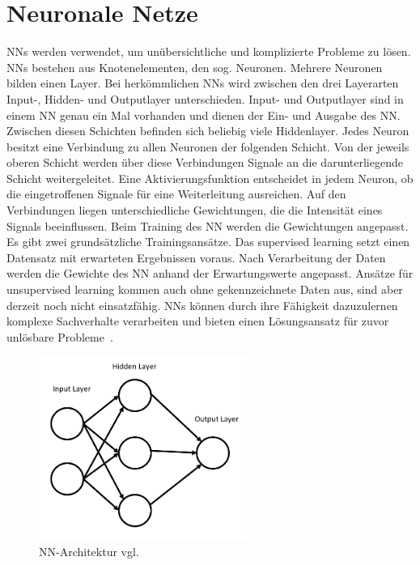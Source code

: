 \section*{Neuronale Netze}
NNs werden verwendet, um unübersichtliche und komplizierte Probleme zu lösen. NNs bestehen aus Knotenelementen, den sog. Neuronen. Mehrere Neuronen bilden einen Layer. Bei herkömmlichen NNs wird zwischen den drei Layerarten Input-, Hidden- und Outputlayer unterschieden. Input- und Outputlayer sind in einem NN genau ein Mal vorhanden und dienen der Ein- und Ausgabe des NN. Zwischen diesen Schichten befinden sich beliebig viele Hiddenlayer. Jedes Neuron besitzt eine Verbindung zu allen Neuronen der folgenden Schicht. Von der jeweils oberen Schicht werden über diese Verbindungen Signale an die darunterliegende Schicht weitergeleitet. Eine Aktivierungsfunktion entscheidet in jedem Neuron, ob die eingetroffenen Signale für eine Weiterleitung ausreichen. Auf den Verbindungen liegen unterschiedliche Gewichtungen, die die Intensität eines Signals beeinflussen. Beim Training des NN werden die Gewichtungen angepasst.
Es gibt zwei grundsätzliche Trainingsansätze. Das supervised learning setzt einen Datensatz mit erwarteten Ergebnissen voraus. Nach Verarbeitung der Daten werden die Gewichte des NN anhand der Erwartungswerte angepasst. Ansätze für unsupervised learning kommen auch ohne gekennzeichnete Daten aus, sind aber derzeit noch nicht einsatzfähig. NNs können durch ihre Fähigkeit dazuzulernen komplexe Sachverhalte verarbeiten und bieten einen Lösungsansatz für zuvor unlösbare Probleme~\cite{Maind2014}.\\
\begin{figure}[h]
\includegraphics[width=\linewidth, height=6cm]{Bilder/NN/NeuralNetwork.png}
\caption{NN-Architektur vgl. \cite{Maind2014}}
\end{figure}
\\
\\
\\
